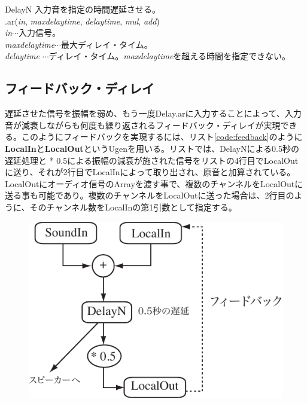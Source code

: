 \documentclass{jsarticle}
\begin{document}
\begin{itembox}[l]{DelayN}
	{\footnotesize 
	入力音を指定の時間遅延させる。\\
	.ar({\it in}, {\it maxdelaytime}, {\it delaytime}, {\it mul}, {\it add})\\
	{\it in}$\cdots$入力信号。\\
	{\it maxdelaytime}$\cdots$最大ディレイ・タイム。\\
	{\it delaytime} $\cdots$ディレイ・タイム。{\it maxdelaytime}を超える時間を指定できない。\\
	}
\end{itembox}

\subsection{フィードバック・ディレイ}
遅延させた信号を振幅を弱め、もう一度Delay.arに入力することによって、入力音が減衰しながらも何度も繰り返されるフィードバック・ディレイが実現できる。このようにフィードバックを実現するには、リスト\ref{code:feedback}のように{\bf LocalIn}と{\bf LocalOut}というUgenを用いる。リストでは、DelayNによる0.5秒の遅延処理と * 0.5による振幅の減衰が施された信号をリストの4行目でLocalOutに送り、それが2行目でLocalInによって取り出され、原音と加算されている。LocalOutにオーディオ信号のArrayを渡す事で、複数のチャンネルをLocalOutに送る事も可能であり。複数のチャンネルをLocalOutに送った場合は、2行目のように、そのチャンネル数をLocalInの第1引数として指定する。

\begin{figure}[htbp]
	\begin{center}
		\includegraphics[scale=0.7]{feedback.pdf}
	\end{center}
	\label{フィードバック・ディレイの成り立ち}
\end{figure}
\end{document}
